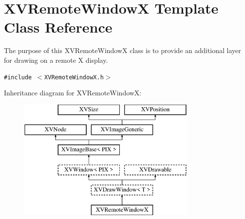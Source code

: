 \hypertarget{class_XVRemoteWindowX}{
\section{XVRemote\-Window\-X  Template Class Reference}
\label{XVRemoteWindowX}
}
The purpose of this XVRemote\-Window\-X class is to provide an additional layer for drawing on a remote X display. 


{\tt \#include $<$XVRemote\-Window\-X.h$>$}

Inheritance diagram for XVRemote\-Window\-X:\begin{figure}[H]
\begin{center}
\leavevmode
\includegraphics[height=6cm]{class_XVRemoteWindowX}
\end{center}
\end{figure}
